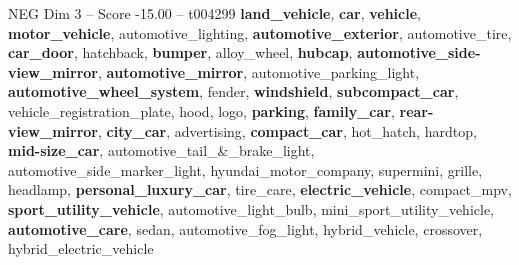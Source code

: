 \begin{textsample}{NEG Dim 3 – Score -15.00 – t004299}  \label{ex:f3_neg_001}
\textbf{land\_vehicle}, \textbf{car}, \textbf{vehicle}, \textbf{motor\_vehicle}, automotive\_lighting, \textbf{automotive\_exterior}, automotive\_tire, \textbf{car\_door}, hatchback, \textbf{bumper}, alloy\_wheel, \textbf{hubcap}, \textbf{automotive\_side-view\_mirror}, \textbf{automotive\_mirror}, automotive\_parking\_light, \textbf{automotive\_wheel\_system}, fender, \textbf{windshield}, \textbf{subcompact\_car}, vehicle\_registration\_plate, hood, logo, \textbf{parking}, \textbf{family\_car}, \textbf{rear-view\_mirror}, \textbf{city\_car}, advertising, \textbf{compact\_car}, hot\_hatch, hardtop, \textbf{mid-size\_car}, automotive\_tail\_\&\_brake\_light, automotive\_side\_marker\_light, hyundai\_motor\_company, supermini, grille, headlamp, \textbf{personal\_luxury\_car}, tire\_care, \textbf{electric\_vehicle}, compact\_mpv, \textbf{sport\_utility\_vehicle}, automotive\_light\_bulb, mini\_sport\_utility\_vehicle, \textbf{automotive\_care}, sedan, automotive\_fog\_light, hybrid\_vehicle, crossover, hybrid\_electric\_vehicle

\end{textsample}
